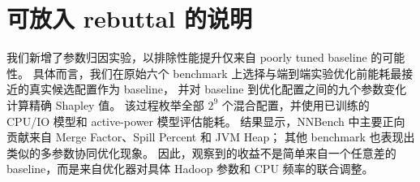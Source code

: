 \documentclass[UTF8]{ctexart}
\begin{document}
\section{可放入 rebuttal 的说明}

我们新增了参数归因实验，以排除性能提升仅来自 poorly tuned baseline 的可能性。
具体而言，我们在原始六个 benchmark 上选择与端到端实验优化前能耗最接近的真实候选配置作为 baseline，
并对 baseline 到优化配置之间的九个参数变化计算精确 Shapley 值。
该过程枚举全部 \(2^9\) 个混合配置，并使用已训练的 CPU/IO 模型和 active-power 模型评估能耗。
结果显示，NNBench 中主要正向贡献来自 Merge Factor、Spill Percent 和 JVM Heap；
其他 benchmark 也表现出类似的多参数协同优化现象。
因此，观察到的收益不是简单来自一个任意差的 baseline，而是来自优化器对具体 Hadoop 参数和 CPU 频率的联合调整。
\end{document}
